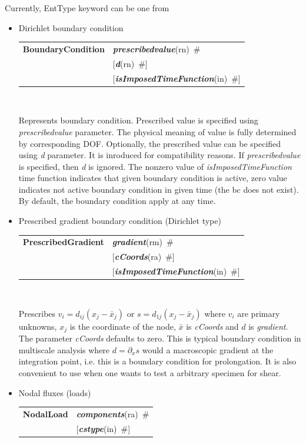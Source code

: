 \documentclass[a4paper]{article}
\makeatletter
\newcommand{\param}[1]{{\em #1}}
\newcommand{\keywordnotype}[1]{\mbox{{\it{\bf{#1}}}}}
\newcommand{\keyword}[2]{\mbox{{\keywordnotype{#1}\tiny (#2)}}}
\newcommand{\entKeywordInst}[1]{\mbox{{\bf{{#1}}}}}
\newcommand{\field}[2]{\mbox{\keyword{#1}{#2}~\#}}
\newcommand{\optField}[2]{\mbox{[\field{#1}{#2}]}}
\newenvironment{record}[1][]{\begin{tabular}{|ll}}{\end{tabular}\\}
\newcommand{\recentry}[2]{{#1}&{#2}\\}
\newcounter{rcc}
\newenvironment{record}[1][\textwidth]{\setcounter{rcc}{0}\begin{tabular*}{#1}{|ll@{\extracolsep{\fill}}r}}{\end{tabular*}\\}
\newcommand{\recentry}[2]{\ifthenelse{\value{rcc}>0}{&$\backslash$ \\}{\setcounter{rcc}{1}}{#1}&{#2}}
\makeatother
\begin{document}
Currently, EntType keyword can be one from
\begin{itemize}
\item Dirichlet boundary condition

  \noindent
  \begin{record}[0.9\textwidth]
    \recentry{\entKeywordInst{BoundaryCondition}}{\field{prescribedvalue}{rn}}
    \recentry{}{\optField{d}{rn}}
    \recentry{}{\optField{is\-Impo\-sed\-Ti\-me\-Fun\-ction}{in}}
  \end{record}

  Represents boundary condition.
Prescribed value is specified using \param{prescribedvalue} parameter. The
physical meaning of value is fully determined by corresponding DOF.
Optionally, the prescribed value can be specified using \param{d}
parameter. It is inroduced for compatibility reasons. If
\param{prescribedvalue} is specified, then \param{d} is ignored.
The nonzero value of \param{isImposedTimeFunction} time function
indicates that given boundary condition is active, zero value
indicates not active boundary condition in given time (the bc does not
exist). By default, the boundary condition apply at any time.

\item Prescribed gradient boundary condition (Dirichlet type)

  \begin{record}[0.9\textwidth]
    \recentry{\entKeywordInst{PrescribedGradient}}{\field{gradient}{rm}}
    \recentry{}{\optField{cCoords}{ra}}
    \recentry{}{\optField{isImposedTimeFunction}{in}}
  \end{record}

  Prescribes $ v_i = d_{ij}(x_j-\bar{x}_j) $ or $ s = d_{1j}(x_j - \bar{x}_j) $
where $ v_i $ are primary unknowns, $x_j$ is the coordinate of the node, $\bar x$ is \param{cCoords} and $d$ is \param{gradient}.
The parameter \param{cCoords} defaults to zero.
This is typical boundary condition in multiscale analysis where $ d = \partial_x s$
would a macroscopic gradient at the integration point, i.e. this is a boundary condition for prolongation.
It is also convenient to use when one wants to test a arbitrary specimen for shear. 

\item Nodal fluxes (loads)

\noindent
\begin{record}[0.9\textwidth]
  \recentry{\entKeywordInst{NodalLoad}}{\field{components}{ra}} \recentry{}{\optField{cstype}{in}}
\end{record}


\end{itemize}
\end{document}
